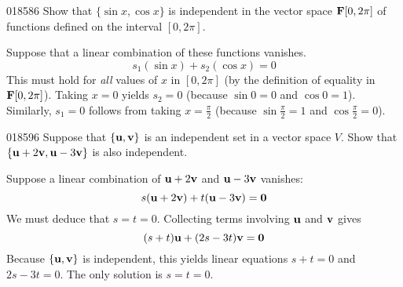 \begin{example}{}{018586}
Show that $\{\sin x, \cos x\}$ is independent in the vector space $\textbf{F}[0, 2\pi]$ of functions defined on the interval $[0, 2\pi]$.

\begin{solution}
Suppose that a linear combination of these functions vanishes.
\begin{equation*}
s_1(\sin x) + s_2(\cos x) = 0
\end{equation*}
This must hold for \textit{all} values of $x$ in $[0, 2\pi]$ (by the definition of equality in $\textbf{F}[0, 2\pi]$). Taking $x = 0$ yields $s_{2} = 0$ (because $\sin 0 = 0$ and $\cos 0 = 1$). Similarly, $s_{1} = 0$ follows from taking $x = \frac{\pi}{2}$ (because $\sin \frac{\pi}{2} = 1$ and $\cos \frac{\pi}{2} = 0$).
\end{solution}
\end{example}

\begin{example}{}{018596}
Suppose that $\{\textbf{u}, \textbf{v}\}$ is an independent set in a vector space $V$. Show that $\{\textbf{u} + 2\textbf{v}, \textbf{u} - 3\textbf{v}\}$ is also independent.

\begin{solution}
Suppose a linear combination of $\textbf{u} + 2\textbf{v}$ and $\textbf{u} - 3\textbf{v}$ vanishes:
\begin{equation*}
s(\textbf{u} + 2\textbf{v}) + t(\textbf{u} - 3\textbf{v}) = \textbf{0}
\end{equation*}
We must deduce that $s = t = 0$. Collecting terms involving $\textbf{u}$ and $\textbf{v}$ gives
\begin{equation*}
(s + t)\textbf{u} + (2s - 3t)\textbf{v} = \textbf{0}
\end{equation*}
Because $\{\textbf{u}, \textbf{v}\}$ is independent, this yields linear equations $s + t = 0$ and $2s - 3t = 0$. The only solution is $s = t = 0$.
\end{solution}
\end{example}

